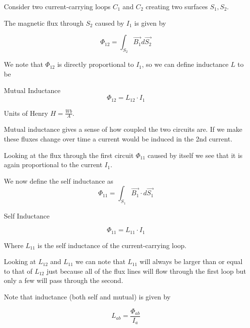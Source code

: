 \documentclass[10pt]{article}
\begin{document}
Consider two current-carrying loops $ C_1 $ and $ C_2 $ creating two surfaces $ S_1, S_2 $. 

The magnetic flux through $ S_2 $ caused by $ I_1 $ is given by

\begin{equation}
	\Phi_{12} = \int_{S_2} \vec{B_1} d \vec{S_2}
\end{equation}

We note that $ \Phi_{12}  $ is directly proportional to $ I_1 $, so we can define inductance $ L $ to be 

\begin{definition}
	Mutual Inductance
	\begin{equation}
		\Phi_{12} = L_{12} \cdot  I_1
		\label{eq:259:mutual_inductance}
	\end{equation}

	Units of Henry $ H = \frac{Wb}{A} $.

	Mutual inductance gives a sense of how coupled the two circuits are.
	If we make these fluxes change over time a current would be induced in the 2nd current.
\end{definition}


Looking at the flux through the first circuit $ \Phi_{11} $ caused by itself we see that it is again proportional to the current $ I_1 $. 

We now define the self inductance as 
	\begin{equation}
		\Phi_{11} = \int_{S_1} \vec{B_1} \cdot d \vec{S_1}
	\end{equation}

\begin{definition}
	Self Inductance

	\begin{equation}
		\Phi_{11} = L_{11} \cdot  I_1
		\label{eq:259:self_inductance}
	\end{equation}

	Where $ L_{11} $ is the self inductance of the current-carrying loop.
\end{definition}

Looking at $ L_{12} $ and $ L_{11} $  we can note that $ L_{11} $ will always be larger than or equal to that of $ L_{12} $ just because all of the flux lines will flow through the first loop but only a few will pass through the second.

Note that inductance (both self and mutual) is given by

\begin{equation}
	L_{ab} = \frac{\Phi_{ab}}{I_a}
	\label{eq:259:general_inductance}
\end{equation}
\end{document}
